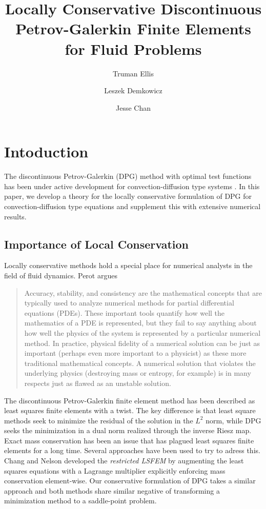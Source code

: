 \documentclass[letterpaper]{article}
\title{Locally Conservative Discontinuous Petrov-Galerkin Finite Elements for
Fluid Problems}
\author{Truman Ellis}
\author{Leszek Demkowicz}
\author{Jesse Chan}
\affil{Institute for Computational Engineering and Sciences,\\
The University of Texas at Austin, \\
Austin, TX 78712}
\date{}
\begin{document}
\maketitle

\begin{abstract}
\end{abstract}

\section{Intoduction}
The discontinuous Petrov-Galerkin (DPG) method with optimal test functions has
been under active development for convection-diffusion type systems
\cite{DPG1, DPG2, DPG3, DPG5, DemkowiczHeuer, ChanHeuerThanhDemkowicz2012,
MoroNguyenPeraire11}. In this paper, we develop a theory for the locally conservative
formulation of DPG for convection-diffusion type equations and supplement this
with extensive numerical results.

\subsection{Importance of Local Conservation}
Locally conservative methods hold a special place for numerical analysts in
the field of fluid dynamics. 
Perot\cite{Perot2011} argues
\begin{quote}
Accuracy, stability, and consistency are the mathematical concepts that are
typically used to analyze numerical methods for partial differential equations
(PDEs). These important tools quantify how well the mathematics of a PDE is
represented, but they fail to say anything about how well the physics of the
system is represented by a particular numerical method. In practice, physical
fidelity of a numerical solution can be just as important (perhaps even more
important to a physicist) as these more traditional mathematical concepts. A
numerical solution that violates the underlying physics (destroying mass or
entropy, for example) is in many respects just as flawed as an unstable
solution.
\end{quote}

The discontinuous Petrov-Galerkin finite element method has been described as
least squares finite elements with a twist. The key difference is that least
square methods seek to minimize the residual of the solution in the $L^2$
norm, while DPG seeks the minimization in a dual norm realized through the
inverse Riesz map. Exact mass conservation has been an issue that has plagued
least squares finite elements for a long time. Several approaches have been
used to try to adress this. Chang and Nelson\cite{ChangNelson1997} developed
the \emph{restricted LSFEM}\cite{ChangNelson1997} by augmenting the least squares
equations with a Lagrange multiplier explicitly enforcing mass conservation
element-wise. Our conservative formulation of DPG takes a similar approach and
both methods share similar negative of transforming a minimization method to a
saddle-point problem.
\end{document}
